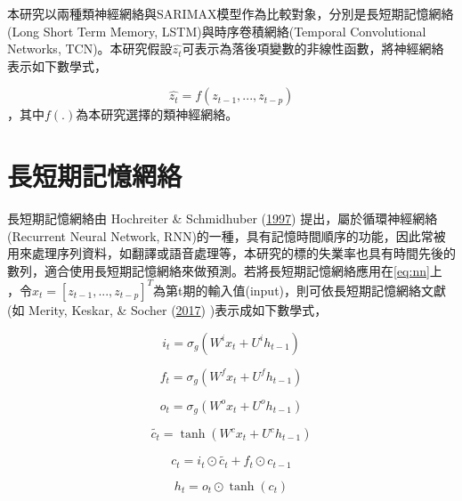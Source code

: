 \documentclass[oneside]{book}
\begin{document}
本研究以兩種類神經網絡與SARIMAX模型作為比較對象，分別是長短期記憶網絡(Long Short Term Memory, LSTM)與時序卷積網絡(Temporal Convolutional Networks, TCN)。本研究假設\(\hat{z_t}\)可表示為落後項變數的非線性函數，將神經網絡表示如下數學式，

\begin{equation} 
  \hat{z_t} = f(z_{t-1},...,z_{t-p})
  \label{eq:nn}
\end{equation}
，其中\(f(.)\)為本研究選擇的類神經網絡。

\hypertarget{ux9577ux77edux671fux8a18ux61b6ux7db2ux7d61}{%
\section{長短期記憶網絡}\label{ux9577ux77edux671fux8a18ux61b6ux7db2ux7d61}}

長短期記憶網絡由 Hochreiter \& Schmidhuber (\protect\hyperlink{ref-hochreiterLongShortTermMemory1997}{1997}) 提出，屬於循環神經網絡(Recurrent Neural Network, RNN)的一種，具有記憶時間順序的功能，因此常被用來處理序列資料，如翻譯或語音處理等，本研究的標的失業率也具有時間先後的數列，適合使用長短期記憶網絡來做預測。若將長短期記憶網絡應用在\eqref{eq:nn}上 ，令\(x_t=[z_{t-1},...,z_{t-p}]^T\)為第t期的輸入值(input)，則可依長短期記憶網絡文獻(如 Merity, Keskar, \& Socher (\protect\hyperlink{ref-merityRegularizingOptimizingLSTM2017}{2017}) )表示成如下數學式，

\begin{equation} 
  i_t = \sigma_g(W^ix_t+U^ih_{t-1}) 
  \label{eq:InputGate}
\end{equation}

\begin{equation} 
  f_t = \sigma_g(W^fx_t+U^fh_{t-1})
  \label{eq:ForgetGate}
\end{equation}

\begin{equation} 
  o_t = \sigma_g(W^ox_t+U^oh_{t-1})
  \label{eq:OutputGate}
\end{equation}

\begin{equation} 
   \tilde{c_t} =\tanh(W^cx_t+U^ch_{t-1})
  \label{eq:tildeC}
\end{equation}

\begin{equation} 
   c_t = i_t \odot \tilde{c_t}+ f_t \odot c_{t-1}
  \label{eq:ct}
\end{equation}

\begin{equation} 
   h_t = o_t \odot \tanh(c_t)
  \label{eq:ht}
\end{equation}
\end{document}
